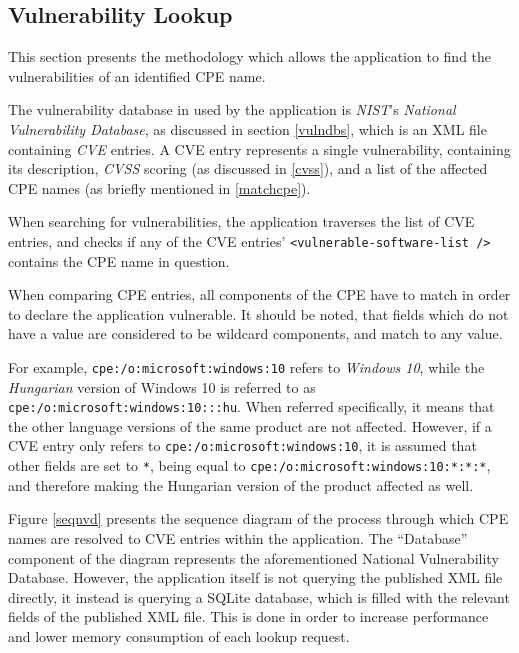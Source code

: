 \documentclass[a4paper,12pt]{article}
\begin{document}
\subsection{Vulnerability Lookup}
 
	
	This section presents the methodology which allows the application to find the vulnerabilities of an identified CPE name.
	
	The vulnerability database in used by the application is \textit{NIST}'s \textit{National Vulnerability Database}, as discussed in section \ref{vulndbs}, which is an XML file containing \textit{CVE} entries. A CVE entry represents a single vulnerability, containing its description, \textit{CVSS} scoring (as discussed in \ref{cvss}), and a list of the affected CPE names (as briefly mentioned in \ref{matchcpe}).
	
	When searching for vulnerabilities, the application traverses the list of CVE entries, and checks if any of the CVE entries' \texttt{<vulnerable-software-list />} contains the CPE name in question.
	
	When comparing CPE entries, all components of the CPE have to match in order to declare the application vulnerable. It should be noted, that fields which do not have a value are considered to be wildcard components, and match to any value.
	
	For example, \texttt{cpe:/o:microsoft:windows:10} refers to \textit{Windows 10}, while the \textit{Hungarian} version of Windows 10 is referred to as \texttt{cpe:/o:microsoft:windows:10:::hu}. When referred specifically, it means that the other language versions of the same product are not affected. However, if a CVE entry only refers to \texttt{cpe:/o:microsoft:windows:10}, it is assumed that other fields are set to \texttt{*}, being equal to \texttt{cpe:/o:microsoft:windows:10:*:*:*}, and therefore making the Hungarian version of the product affected as well.
	
	Figure \ref{seqnvd} presents the sequence diagram of the process through which CPE names are resolved to CVE entries within the application. The ``Database'' component of the diagram represents the aforementioned National Vulnerability Database. However, the application itself is not querying the published XML file directly, it instead is querying a SQLite database, which is filled with the relevant fields of the published XML file. This is done in order to increase performance and lower memory consumption of each lookup request.
	
\end{document}

